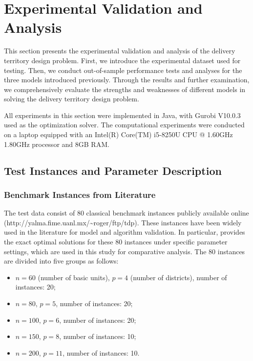 \documentclass[preprint,12pt,authoryear]{elsarticle}
\begin{document}
\section{Experimental Validation and Analysis}

This section presents the experimental validation and analysis of the delivery territory design problem. First, we introduce the experimental dataset used for testing. Then, we conduct out-of-sample performance tests and analyses for the three models introduced previously. Through the results and further examination, we comprehensively evaluate the strengths and weaknesses of different models in solving the delivery territory design problem.

All experiments in this section were implemented in Java, with Gurobi V10.0.3 used as the optimization solver. The computational experiments were conducted on a laptop equipped with an Intel(R) Core(TM) i5-8250U CPU @ 1.60GHz 1.80GHz processor and 8GB RAM.

\subsection{Test Instances and Parameter Description}
\subsubsection{Benchmark Instances from Literature}

The test data consist of 80 classical benchmark instances publicly available online (http://yalma.fime.uanl.mx/\textasciitilde roger/ftp/tdp). These instances have been widely used in the literature \cite{ref23, ref24, ref28} for model and algorithm validation. In particular, \cite{ref24} provides the exact optimal solutions for these 80 instances under specific parameter settings, which are used in this study for comparative analysis. The 80 instances are divided into five groups as follows:

\begin{itemize}
    \item $n = 60$ (number of basic units), $p = 4$ (number of districts), number of instances: 20;
    \item $n = 80$, $p = 5$, number of instances: 20;
    \item $n = 100$, $p = 6$, number of instances: 20;
    \item $n = 150$, $p = 8$, number of instances: 10;
    \item $n = 200$, $p = 11$, number of instances: 10.
\end{itemize}
\end{document}
